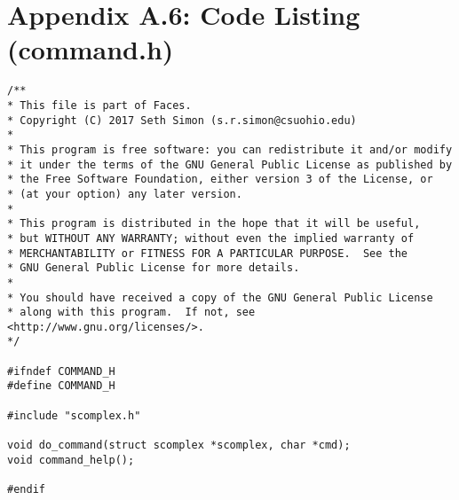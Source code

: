 \documentclass{article}
\begin{document}
\section{Appendix A.6: Code Listing (command.h)}
\small
\begin{verbatim}
/**
* This file is part of Faces.
* Copyright (C) 2017 Seth Simon (s.r.simon@csuohio.edu)
* 
* This program is free software: you can redistribute it and/or modify
* it under the terms of the GNU General Public License as published by
* the Free Software Foundation, either version 3 of the License, or
* (at your option) any later version.
* 
* This program is distributed in the hope that it will be useful,
* but WITHOUT ANY WARRANTY; without even the implied warranty of
* MERCHANTABILITY or FITNESS FOR A PARTICULAR PURPOSE.  See the
* GNU General Public License for more details.
* 
* You should have received a copy of the GNU General Public License
* along with this program.  If not, see <http://www.gnu.org/licenses/>.
*/

#ifndef COMMAND_H
#define COMMAND_H

#include "scomplex.h"

void do_command(struct scomplex *scomplex, char *cmd);
void command_help();

#endif
\end{verbatim}
\normalsize
\end{document}
